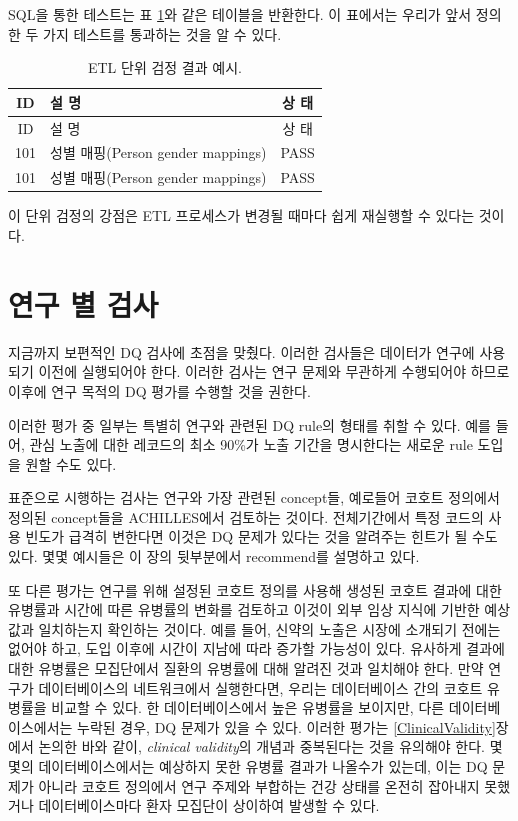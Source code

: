 \documentclass[10.5pt]{book}
\theoremstyle{definition}
\theoremstyle{definition}
\theoremstyle{definition}
\theoremstyle{remark}
\begin{document}
SQL을 통한 테스트는 표 \ref{tab:exampleTestResults}와 같은 테이블을
반환한다. 이 표에서는 우리가 앞서 정의한 두 가지 테스트를 통과하는 것을
알 수 있다.

\begin{longtable}[]{@{}clc@{}}
\caption{\label{tab:exampleTestResults} ETL 단위 검정 결과
예시.}\tabularnewline
\toprule
ID & 설 명 & 상 태\tabularnewline
\midrule
\endfirsthead
\toprule
ID & 설 명 & 상 태\tabularnewline
\midrule
\endhead
101 & 성별 매핑(Person gender mappings) & PASS\tabularnewline
101 & 성별 매핑(Person gender mappings) & PASS\tabularnewline
\bottomrule
\end{longtable}

이 단위 검정의 강점은 ETL 프로세스가 변경될 때마다 쉽게 재실행할 수
있다는 것이다.

\section{연구 별 검사}\label{--}


지금까지 보편적인 DQ 검사에 초점을 맞췄다. 이러한 검사들은 데이터가
연구에 사용되기 이전에 실행되어야 한다. 이러한 검사는 연구 문제와
무관하게 수행되어야 하므로 이후에 연구 목적의 DQ 평가를 수행할 것을
권한다.

이러한 평가 중 일부는 특별히 연구와 관련된 DQ rule의 형태를 취할 수
있다. 예를 들어, 관심 노출에 대한 레코드의 최소 90\%가 노출 기간을
명시한다는 새로운 rule 도입을 원할 수도 있다.

표준으로 시행하는 검사는 연구와 가장 관련된 concept들, 예로들어 코호트
정의에서 정의된 concept들을 ACHILLES에서 검토하는 것이다. 전체기간에서
특정 코드의 사용 빈도가 급격히 변한다면 이것은 DQ 문제가 있다는 것을
알려주는 힌트가 될 수도 있다. 몇몇 예시들은 이 장의 뒷부분에서
recommend를 설명하고 있다.

또 다른 평가는 연구를 위해 설정된 코호트 정의를 사용해 생성된 코호트
결과에 대한 유병률과 시간에 따른 유병률의 변화를 검토하고 이것이 외부
임상 지식에 기반한 예상값과 일치하는지 확인하는 것이다. 예를 들어,
신약의 노출은 시장에 소개되기 전에는 없어야 하고, 도입 이후에 시간이
지남에 따라 증가할 가능성이 있다. 유사하게 결과에 대한 유병률은
모집단에서 질환의 유병률에 대해 알려진 것과 일치해야 한다. 만약 연구가
데이터베이스의 네트워크에서 실행한다면, 우리는 데이터베이스 간의 코호트
유병률을 비교할 수 있다. 한 데이터베이스에서 높은 유병률을 보이지만,
다른 데이터베이스에서는 누락된 경우, DQ 문제가 있을 수 있다. 이러한
평가는 \ref{ClinicalValidity}장에서 논의한 바와 같이, \emph{clinical
validity}의 개념과 중복된다는 것을 유의해야 한다. 몇몇의
데이터베이스에서는 예상하지 못한 유병률 결과가 나올수가 있는데, 이는 DQ
문제가 아니라 코호트 정의에서 연구 주제와 부합하는 건강 상태를 온전히
잡아내지 못했거나 데이터베이스마다 환자 모집단이 상이하여 발생할 수
있다.
\end{document}
